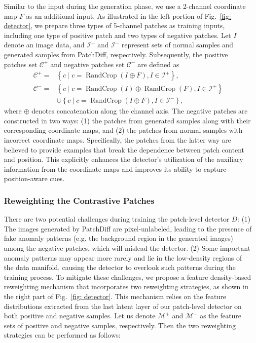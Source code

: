 \documentclass[letterpaper]{article} %
\begin{document}
Similar to the input during the generation phase, we use a 2-channel coordinate map $F$ as an additional input. As illustrated in the left portion of Fig.~\ref{fig: detector}, we prepare three types of 5-channel patches as training inputs, including one type of positive patch and two types of negative patches. Let $I$ denote an image data, and $\mathcal{I}^{+}$ and $\mathcal{I}^{-}$ represent sets of normal samples and generated samples from PatchDiff, respectively. Subsequently, the positive patches set $\mathcal{C}^{+}$ and negative patches set $\mathcal{C}^{-}$ are defined as
\begin{equation*}
    \begin{aligned}
    \mathcal{C}^{+}=&\left\{c \mid c=\operatorname{RandCrop}(I\oplus F), I \in \mathcal{I}^{+}\right\},\\
    \mathcal{C}^{-}=&\left\{c \mid c=\operatorname{RandCrop}(I)\oplus \operatorname{RandCrop}(F), I \in \mathcal{I}^{+}\right\} \\
    &\cup\left\{c \mid c=\operatorname{RandCrop}(I\oplus F), I \in \mathcal{I}^{-}\right\},
    \end{aligned}
\end{equation*}
where $\oplus$ denotes concatenation along the channel axis. The negative patches are constructed in two ways: (1) the patches from generated samples along with their corresponding coordinate maps, and (2) the patches from normal samples with incorrect coordinate maps. Specifically, the patches from the latter way are believed to provide examples that break the dependence between patch content and position. This explicitly enhances the detector's utilization of the auxiliary information from the coordinate maps and improves its ability to capture position-aware cues.

\subsubsection{Reweighting the Contrastive Patches}
There are two potential challenges during training the patch-level detector $D$: (1) The images generated by PatchDiff are pixel-unlabeled, leading to the presence of fake anomaly patterns (e.g. the background region in the generated images) among the negative patches, which will mislead the detector. (2) Some important anomaly patterns may appear more rarely and lie in the low-density regions of the data manifold, causing the detector to overlook such patterns during the training process. To mitigate these challenges, we propose a feature density-based reweighting mechanism that incorporates two reweighting strategies, as shown in the right part of Fig.~\ref{fig: detector}. This mechanism relies on the feature distributions extracted from the last latent layer of our patch-level detector on both positive and negative samples. Let us denote $\mathcal{M}^+$ and $\mathcal{M}^-$ as the feature sets of positive and negative samples, respectively. Then the two reweighting strategies can be performed as follows:
\end{document}
